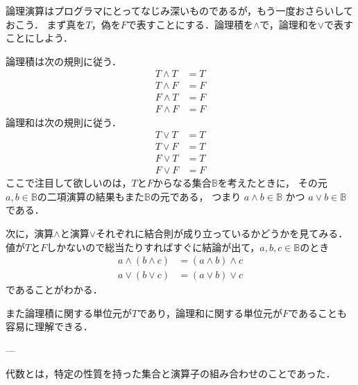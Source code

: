 \documentclass{jsbook}
\begin{document}
論理演算はプログラマにとってなじみ深いものであるが，もう一度おさらいしておこう．
まず真を$T$，偽を$F$で表すことにする．論理積を$\wedge$で，論理和を$\vee$で表すことにしよう．

論理積は次の規則に従う．
\begin{align}
T\wedge T&=T\\
T\wedge F&=F\\
F\wedge T&=F\\
F\wedge F&=F
\end{align}
論理和は次の規則に従う．
\begin{align}
T\vee T&=T\\
T\vee F&=T\\
F\vee T&=T\\
F\vee F&=F
\end{align}
ここで注目して欲しいのは，$T$と$F$からなる集合$\mathbb{B}$を考えたときに，
その元$a,b\in\mathbb{B}$の二項演算の結果もまた$\mathbb{B}$の元である，
つまり $a\wedge b\in\mathbb{B}$ かつ $a\vee b\in\mathbb{B}$ である．

次に，演算$\wedge$と演算$\vee$それぞれに結合則が成り立っているかどうかを見てみる．
値が$T$と$F$しかないので総当たりすればすぐに結論が出て，$a,b,c\in\mathbb{B}$のとき
\begin{align}
a\wedge(b\wedge c)&=(a\wedge b)\wedge c\\
a\vee(b\vee c)&=(a\vee b)\vee c
\end{align}
であることがわかる．

また論理積に関する単位元が$T$であり，論理和に関する単位元が$F$であることも容易に理解できる．





---





代数とは，特定の性質を持った集合と演算子の組み合わせのことであった．
\end{document}
